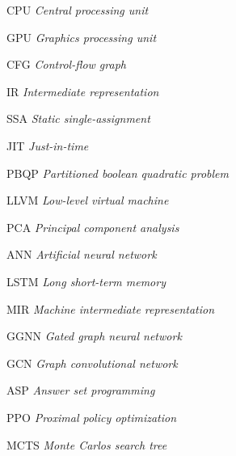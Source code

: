 \documentclass[
	12pt,				%
	openright,			%
	oneside,			%
	a4paper,			%
	tccpreliminar,			%
	]{ABNT-DC-UEL}
\begin{document}
\listoftables*
\cleardoublepage

\begin{siglas}
  \item[CPU] \textit{Central processing unit}
  \item[GPU] \textit{Graphics processing unit}
  \item[CFG] \textit{Control-flow graph}
  \item[IR] \textit{Intermediate representation}
  \item[SSA] \textit{Static single-assignment}
  \item[JIT] \textit{Just-in-time}
  \item[PBQP] \textit{Partitioned boolean quadratic problem}
  \item[LLVM] \textit{Low-level virtual machine}
  \item[PCA] \textit{Principal component analysis}
  \item[ANN] \textit{Artificial neural network}
  \item[LSTM] \textit{Long short-term memory}
  \item[MIR] \textit{Machine intermediate representation}
  \item[GGNN] \textit{Gated graph neural network}
  \item[GCN] \textit{Graph convolutional network}
  \item[ASP] \textit{Answer set programming}
  \item[PPO] \textit{Proximal policy optimization}
  \item[MCTS] \textit{Monte Carlos search tree}
\end{siglas}

\end{document}
